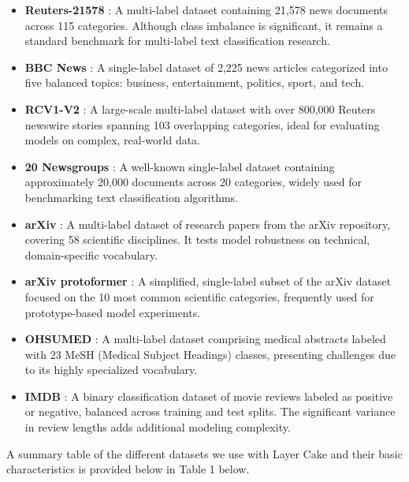 \documentclass[final]{clv2025-revised}
\begin{document}
\begin{itemize}
    \item \textbf{Reuters-21578} \cite{lewis1987reuters}: A multi-label dataset containing 21,578 news documents across 115 categories. Although class imbalance is significant, it remains a standard benchmark for multi-label text classification research.
    
    \item \textbf{BBC News} \cite{greene}: A single-label dataset of 2,225 news articles categorized into five balanced topics: business, entertainment, politics, sport, and tech.
    
    \item \textbf{RCV1-V2} \cite{lewis2004}: A large-scale multi-label dataset with over 800,000 Reuters newswire stories spanning 103 overlapping categories, ideal for evaluating models on complex, real-world data.
    
    \item \textbf{20 Newsgroups} \cite{LANG1995331}: A well-known single-label dataset containing approximately 20,000 documents across 20 categories, widely used for benchmarking text classification algorithms.
    
    \item \textbf{arXiv} \cite{sinha}: A multi-label dataset of research papers from the arXiv repository, covering 58 scientific disciplines. It tests model robustness on technical, domain-specific vocabulary.
    
    \item \textbf{arXiv protoformer} \cite{farhangi}: A simplified, single-label subset of the arXiv dataset focused on the 10 most common scientific categories, frequently used for prototype-based model experiments.
    
    \item \textbf{OHSUMED} \cite{sanderson}: A multi-label dataset comprising medical abstracts labeled with 23 MeSH (Medical Subject Headings) classes, presenting challenges due to its highly specialized vocabulary.
    
    \item \textbf{IMDB} \cite{maas}: A binary classification dataset of movie reviews labeled as positive or negative, balanced across training and test splits. The significant variance in review lengths adds additional modeling complexity.
\end{itemize}

A summary table of the different datasets we use with Layer Cake and their basic characteristics is provided below in Table 1 below.
\end{document}
